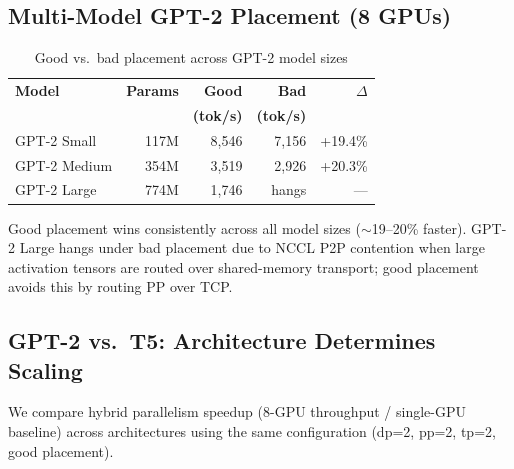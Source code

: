 \documentclass[conference]{IEEEtran}
\begin{document}
\subsection{Multi-Model GPT-2 Placement (8 GPUs)}

\begin{table}[h]
\centering
\caption{Good vs.\ bad placement across GPT-2 model sizes}
\label{tab:multimodel}
\small
\begin{tabular}{lrrrr}
\toprule
\textbf{Model} & \textbf{Params} & \textbf{Good} & \textbf{Bad} & \textbf{$\Delta$} \\
 & & \textbf{(tok/s)} & \textbf{(tok/s)} & \\
\midrule
GPT-2 Small & 117M & 8,546 & 7,156 & +19.4\% \\
GPT-2 Medium & 354M & 3,519 & 2,926 & +20.3\% \\
GPT-2 Large & 774M & 1,746 & hangs & --- \\
\bottomrule
\end{tabular}
\end{table}

Good placement wins consistently across all model sizes ($\sim$19--20\% faster). GPT-2 Large hangs under bad placement due to NCCL P2P contention when large activation tensors are routed over shared-memory transport; good placement avoids this by routing PP over TCP.

\subsection{GPT-2 vs.\ T5: Architecture Determines Scaling}

We compare hybrid parallelism speedup (8-GPU throughput / single-GPU baseline) across architectures using the same configuration (dp=2, pp=2, tp=2, good placement).

\begin{table}[h]
\centering
\caption{Hybrid parallelism scaling by architecture}
\label{tab:arch}
\end{table}
\end{document}
